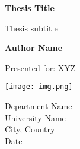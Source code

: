 \begin{titlepage}
    \begin{center}
        \vspace*{1cm}
        
        \Huge
        \textbf{Thesis Title}

        \vspace{0.5cm}

        \LARGE
        Thesis subtitle

        \vspace{1.5cm}

        \textbf{Author Name}

        \vfill
        
        Presented for: XYZ

        \vspace{0.8cm}

        \texttt{[image: img.png]}

        \Large
        Department Name\\
        University Name\\
        City, Country\\
        Date

    \end{center}
\end{titlepage}
